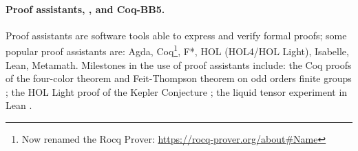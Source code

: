 \documentclass[sigconf,screen]{acmart}
\theoremstyle{definition} %
\numberwithin{equation}{section}
\theoremstyle{definition} %
\newcommand{\ts}[1]{{\color{red}#1}}
\newcommand{\tsm}[1]{\todo{TS: #1}}
\newcommand{\CoqBB}{Coq-BB5\xspace}
\begin{document}





\paragraph{Proof assistants, \Coq, and \CoqBB.} Proof assistants are software tools able to express and verify formal proofs; some popular proof assistants are: Agda, Coq\footnote{Now renamed the Rocq Prover: \url{https://rocq-prover.org/about\#Name}}, F*, HOL (HOL4/HOL Light), Isabelle, Lean, Metamath. Milestones in the use of proof assistants include: the Coq proofs of the four-color theorem \cite{gonthier2008formal, gonthier2023computer} and Feit-Thompson theorem on odd orders finite groups \cite{gonthier2013machine}; the HOL Light proof of the Kepler Conjecture \cite{3fdf2c9143a54629bba02e34f24c7698}; the liquid tensor experiment in Lean \cite{2309.14870,LeanCommunityLTE2022}.
\end{document}
